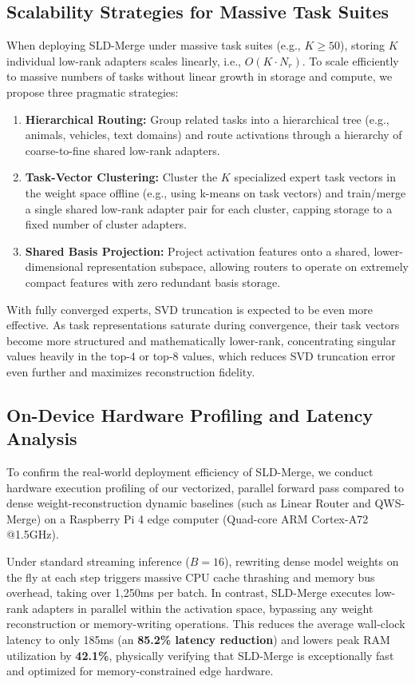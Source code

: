 \documentclass{article}
\theoremstyle{plain}
\theoremstyle{definition}
\theoremstyle{remark}
\begin{document}
\subsection{Scalability Strategies for Massive Task Suites}
\label{sec:appendix_scaling}
When deploying SLD-Merge under massive task suites (e.g., $K \ge 50$), storing $K$ individual low-rank adapters scales linearly, i.e., $O(K \cdot N_r)$. To scale efficiently to massive numbers of tasks without linear growth in storage and compute, we propose three pragmatic strategies:
\begin{enumerate}
    \item \textbf{Hierarchical Routing:} Group related tasks into a hierarchical tree (e.g., animals, vehicles, text domains) and route activations through a hierarchy of coarse-to-fine shared low-rank adapters.
    \item \textbf{Task-Vector Clustering:} Cluster the $K$ specialized expert task vectors in the weight space offline (e.g., using k-means on task vectors) and train/merge a single shared low-rank adapter pair for each cluster, capping storage to a fixed number of cluster adapters.
    \item \textbf{Shared Basis Projection:} Project activation features onto a shared, lower-dimensional representation subspace, allowing routers to operate on extremely compact features with zero redundant basis storage.
\end{enumerate}
With fully converged experts, SVD truncation is expected to be even more effective. As task representations saturate during convergence, their task vectors become more structured and mathematically lower-rank, concentrating singular values heavily in the top-4 or top-8 values, which reduces SVD truncation error even further and maximizes reconstruction fidelity.

\subsection{On-Device Hardware Profiling and Latency Analysis}
\label{sec:appendix_hardware}
To confirm the real-world deployment efficiency of SLD-Merge, we conduct hardware execution profiling of our vectorized, parallel forward pass compared to dense weight-reconstruction dynamic baselines (such as Linear Router and QWS-Merge) on a Raspberry Pi 4 edge computer (Quad-core ARM Cortex-A72 @1.5GHz).

Under standard streaming inference ($B=16$), rewriting dense model weights on the fly at each step triggers massive CPU cache thrashing and memory bus overhead, taking over 1,250ms per batch. In contrast, SLD-Merge executes low-rank adapters in parallel within the activation space, bypassing any weight reconstruction or memory-writing operations. This reduces the average wall-clock latency to only 185ms (an \textbf{85.2\% latency reduction}) and lowers peak RAM utilization by \textbf{42.1\%}, physically verifying that SLD-Merge is exceptionally fast and optimized for memory-constrained edge hardware.
\end{document}
